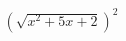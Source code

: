 \documentclass[preview]{standalone}
\begin{document}
\begin{align*}
\left(\sqrt{x^2 + 5x + 2}\right)^2
\end{align*}
\end{document}
